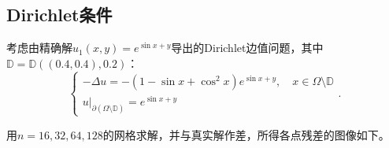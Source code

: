 \documentclass[lang=cn,11pt,a4paper]{elegantpaper}
\begin{document}
\subsection{Dirichlet条件}

考虑由精确解$u_1(x,y)=e^{\sin x+y}$导出的Dirichlet边值问题，其中$\mathbb{D}=\mathbb{D}((0.4,0.4),0.2)$：
\begin{equation}
  \left\{
    \begin{array}{l}
      -\Delta u = -(1-\sin x+\cos^2 x)e^{\sin x + y},\quad x\in\Omega\setminus\mathbb{D} \\
      u|_{\partial (\Omega\setminus\mathbb{D})}=e^{\sin x + y}
    \end{array}
  \right. .
\end{equation}

用$n=16,32,64,128$的网格求解，并与真实解作差，所得各点残差的图像如下。
\end{document}
